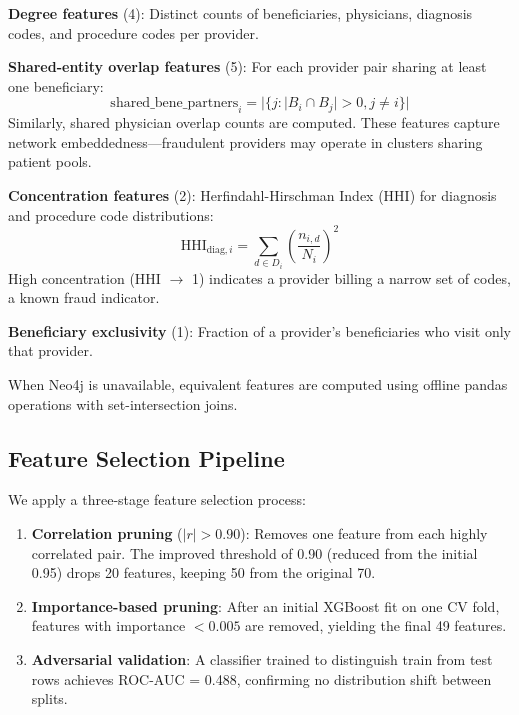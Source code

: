 \documentclass[conference]{IEEEtran}
\begin{document}
\textbf{Degree features} (4): Distinct counts of beneficiaries, physicians, diagnosis codes, and procedure codes per provider.

\textbf{Shared-entity overlap features} (5): For each provider pair sharing at least one beneficiary:
\begin{equation}
    \text{shared\_bene\_partners}_i = |\{j : |B_i \cap B_j| > 0, j \neq i\}|
\end{equation}
Similarly, shared physician overlap counts are computed. These features capture network embeddedness---fraudulent providers may operate in clusters sharing patient pools.

\textbf{Concentration features} (2): Herfindahl-Hirschman Index (HHI) for diagnosis and procedure code distributions:
\begin{equation}
    \text{HHI}_{\text{diag},i} = \sum_{d \in D_i} \left(\frac{n_{i,d}}{N_i}\right)^2
\end{equation}
High concentration (HHI $\to$ 1) indicates a provider billing a narrow set of codes, a known fraud indicator.

\textbf{Beneficiary exclusivity} (1): Fraction of a provider's beneficiaries who visit only that provider.

When Neo4j is unavailable, equivalent features are computed using offline pandas operations with set-intersection joins.

\subsection{Feature Selection Pipeline}

We apply a three-stage feature selection process:

\begin{enumerate}[leftmargin=*]
    \item \textbf{Correlation pruning} ($|r| > 0.90$): Removes one feature from each highly correlated pair. The improved threshold of 0.90 (reduced from the initial 0.95) drops 20 features, keeping 50 from the original 70.
    \item \textbf{Importance-based pruning}: After an initial XGBoost fit on one CV fold, features with importance $< 0.005$ are removed, yielding the final 49 features.
    \item \textbf{Adversarial validation}: A classifier trained to distinguish train from test rows achieves ROC-AUC = 0.488, confirming no distribution shift between splits.
\end{enumerate}
\end{document}
